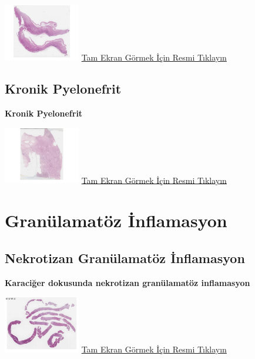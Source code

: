 \documentclass[
  letterpaper,
  DIV=11,
  numbers=noendperiod]{scrreprt}
\begin{document}
\href{https://images.patolojiatlasi.com/chronicpyelonephritis/HE2.html}{\includegraphics[width=0.25\textwidth,height=\textheight]{./screenshots/chronicpyelonephritis-2_screenshot.png}}
\href{https://images.patolojiatlasi.com/chronicpyelonephritis/HE2.html}{Tam
Ekran Görmek İçin Resmi Tıklayın}

\hypertarget{sec-kronik-pyelonefrit}{%
\section{Kronik Pyelonefrit}\label{sec-kronik-pyelonefrit}}

\textbf{Kronik Pyelonefrit}

\href{https://images.patolojiatlasi.com/chronic-pyelonephritis/HE.html}{\includegraphics[width=0.25\textwidth,height=\textheight]{./screenshots/chronic-pyelonephritis_screenshot.png}}
\href{https://images.patolojiatlasi.com/chronic-pyelonephritis/HE.html}{Tam
Ekran Görmek İçin Resmi Tıklayın}

\hypertarget{sec-granulamatoz-inflamasyon}{%
\chapter{Granülamatöz İnflamasyon}\label{sec-granulamatoz-inflamasyon}}

\hypertarget{sec-nekrotizan-granulamatoz-inflamasyon}{%
\section{Nekrotizan Granülamatöz
İnflamasyon}\label{sec-nekrotizan-granulamatoz-inflamasyon}}

\textbf{Karaciğer dokusunda nekrotizan granülamatöz inflamasyon}

\href{https://images.patolojiatlasi.com/necrotisinggranuloma/HE.html}{\includegraphics[width=0.25\textwidth,height=\textheight]{./screenshots/necrotisinggranuloma_screenshot.png}}
\href{https://images.patolojiatlasi.com/necrotisinggranuloma/HE.html}{Tam
Ekran Görmek İçin Resmi Tıklayın}
\end{document}
